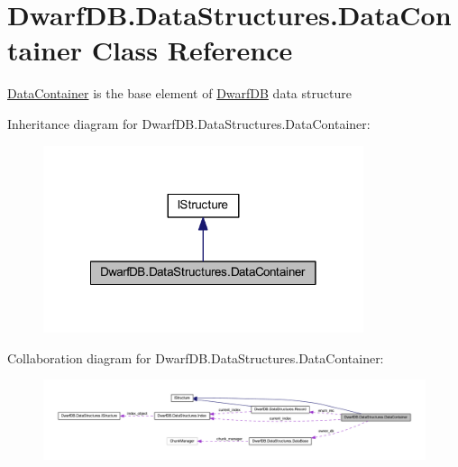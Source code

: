 \hypertarget{class_dwarf_d_b_1_1_data_structures_1_1_data_container}{\section{Dwarf\+D\+B.\+Data\+Structures.\+Data\+Container Class Reference}
\label{class_dwarf_d_b_1_1_data_structures_1_1_data_container}
}


\hyperlink{class_dwarf_d_b_1_1_data_structures_1_1_data_container}{Data\+Container} is the base element of \hyperlink{namespace_dwarf_d_b}{Dwarf\+D\+B} data structure  




Inheritance diagram for Dwarf\+D\+B.\+Data\+Structures.\+Data\+Container\+:\nopagebreak
\begin{figure}[H]
\begin{center}
\leavevmode
\includegraphics[width=266pt]{class_dwarf_d_b_1_1_data_structures_1_1_data_container__inherit__graph}
\end{center}
\end{figure}


Collaboration diagram for Dwarf\+D\+B.\+Data\+Structures.\+Data\+Container\+:\nopagebreak
\begin{figure}[H]
\begin{center}
\leavevmode
\includegraphics[width=350pt]{class_dwarf_d_b_1_1_data_structures_1_1_data_container__coll__graph}
\end{center}
\end{figure}
